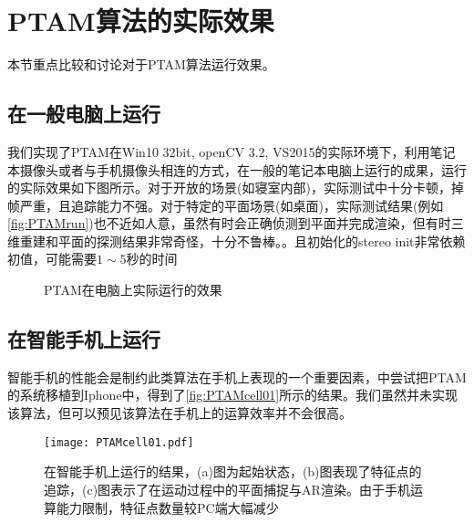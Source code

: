 \section{PTAM算法的实际效果}

本节重点比较和讨论对于PTAM算法运行效果。

\subsection{在一般电脑上运行}

我们实现了PTAM在Win10 32bit, openCV 3.2, VS2015的实际环境下，利用笔记本摄像头或者与手机摄像头相连的方式，在一般的笔记本电脑上运行的成果，运行的实际效果如下图所示。对于开放的场景(如寝室内部)，实际测试中十分卡顿，掉帧严重，且追踪能力不强。对于特定的平面场景(如桌面)，实际测试结果(例如\autoref{fig:PTAMrun})也不近如人意，虽然有时会正确侦测到平面并完成渲染，但有时三维重建和平面的探测结果非常奇怪，十分不鲁棒。。且初始化的stereo init非常依赖初值，可能需要$1\sim5$秒的时间

\begin{figure}[!htbp]
\centering 
{}
\caption{PTAM在电脑上实际运行的效果}
\label{fig:PTAMrun}
\end{figure}

\subsection{在智能手机上运行}

智能手机的性能会是制约此类算法在手机上表现的一个重要因素，\cite{Klein2009}中尝试把PTAM的系统移植到Iphone中，得到了\autoref{fig:PTAMcell01}所示的结果。我们虽然并未实现该算法，但可以预见该算法在手机上的运算效率并不会很高。

\begin{figure}[!htbp]
\centering
\texttt{[image: PTAMcell01.pdf]}
\caption{在智能手机上运行的结果，(a)图为起始状态，(b)图表现了特征点的追踪，(c)图表示了在运动过程中的平面捕捉与AR渲染。由于手机运算能力限制，特征点数量较PC端大幅减少}
\label{fig:PTAMcell01}
\end{figure}
